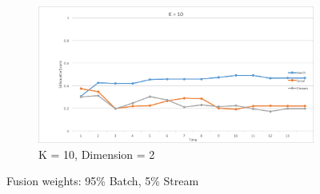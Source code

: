 \documentclass{lmproj}
\begin{document}
\begin{figure}[H]
	\begin{subfigure}{.5\textwidth}
		\centering
		\includegraphics[width=.8\linewidth]{silhouette/silhouette_95_5_k_10_dim_2}
		\caption*{K = 10, Dimension = 2}
		\label{fig:silhouette_95_5_k_10_dim_2}
	\end{subfigure}
	\caption{Fusion weights: 95\% Batch, 5\% Stream}
	\label{fig:fusion_95_5}
\end{figure}

\bigskip
\end{document}

